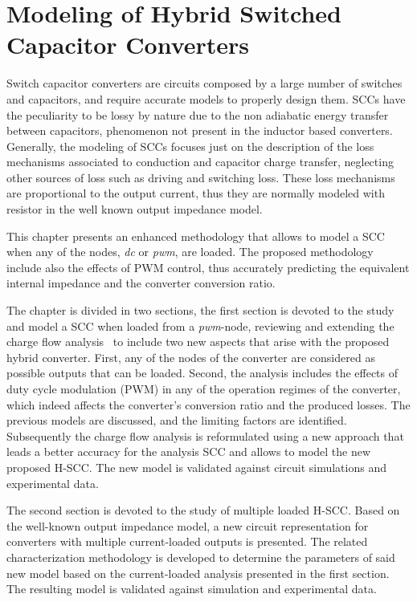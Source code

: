 \chapter[Modeling of H-SCC]{Modeling of Hybrid Switched Capacitor Converters}

Switch capacitor converters are circuits composed by a large number of switches and capacitors, and require accurate models to properly design them. SCCs have the peculiarity to be lossy by nature due to the non adiabatic energy transfer between capacitors, phenomenon not present in the inductor based converters. Generally, the modeling of SCCs focuses just on the description of the loss mechanisms associated to conduction and capacitor charge transfer, neglecting other sources of loss such as driving and switching loss. These loss mechanisms are proportional to the output current, thus they are normally modeled with resistor in the well known output impedance model.

This chapter presents an enhanced methodology that allows to model a SCC when any of the nodes, \emph{dc} or \emph{pwm}, are loaded. The proposed methodology include also the effects of PWM control, thus accurately predicting the equivalent internal impedance and the converter conversion ratio.

The chapter is divided in two sections, the first section is devoted to the study and model a SCC when loaded from a \emph{pwm}-node, reviewing and extending the charge flow analysis~\cite{95Makowski,Seeman:EECS-2009-78} to include two new aspects that arise with the proposed hybrid converter. First, any of the nodes of the converter are considered as possible outputs that can be loaded. Second, the analysis includes the effects of duty cycle modulation (PWM) in any of the operation regimes of the converter, which indeed affects the converter's conversion ratio and the produced losses. The previous models are discussed, and the limiting factors are identified. Subsequently the charge flow analysis is reformulated using a new approach that leads a better accuracy for the analysis SCC and allows to model the new proposed H-SCC. The new model is validated against circuit simulations and experimental data.

The second section is devoted to the study of multiple loaded H-SCC. Based on the well-known output impedance model, a new circuit representation for converters with multiple current-loaded outputs is presented. The related characterization methodology is developed to determine the parameters of said new model based on the current-loaded analysis presented in the first section. The resulting model is validated against simulation and experimental data.


